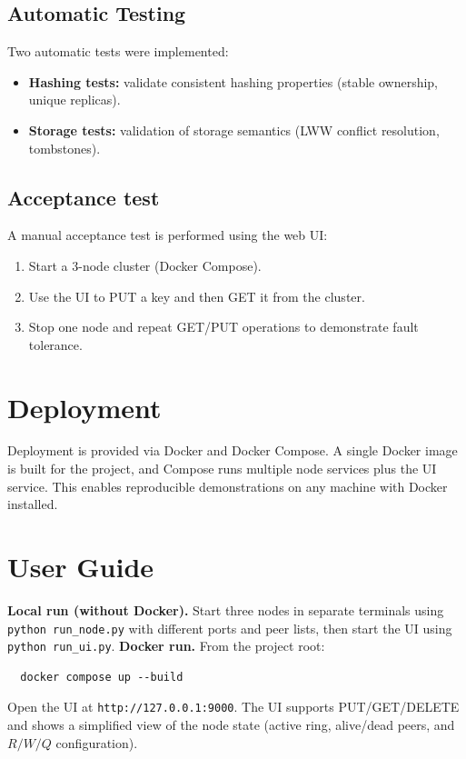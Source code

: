 \documentclass{scrartcl}
\begin{document}
\subsection{Automatic Testing}\label{automatic-testing}
Two automatic tests were implemented:
\begin{itemize}
  \item \textbf{Hashing tests:} validate consistent hashing properties (stable ownership, unique replicas).
  \item \textbf{Storage tests:} validation of storage semantics (LWW conflict resolution, tombstones).
\end{itemize}

\subsection{Acceptance test}\label{acceptance-test}
A manual acceptance test is performed using the web UI:
\begin{enumerate}
  \item Start a 3-node cluster (Docker Compose).
  \item Use the UI to PUT a key and then GET it from the cluster.
  \item Stop one node and repeat GET/PUT operations to demonstrate fault tolerance.
\end{enumerate}

\section{Deployment}\label{deployment}
Deployment is provided via Docker and Docker Compose. A single Docker image is built for the project, and Compose runs multiple node services plus the UI service. This enables reproducible demonstrations on any machine with Docker installed.

\section{User Guide}\label{user-guide}
\textbf{Local run (without Docker).} Start three nodes in separate terminals using \texttt{python run\_node.py} with different ports and peer lists, then start the UI using \texttt{python run\_ui.py}.
\textbf{Docker run.} From the project root:
\begin{verbatim}
  docker compose up --build
\end{verbatim}
Open the UI at \texttt{http://127.0.0.1:9000}. The UI supports PUT/GET/DELETE and shows a simplified view of the node state (active ring, alive/dead peers, and $R/W/Q$ configuration).
\end{document}
